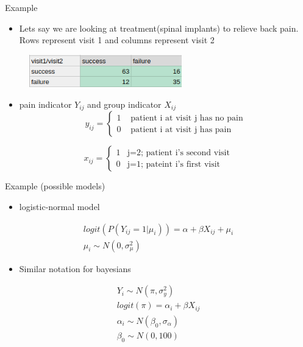 \documentclass[ignorenonframetext,]{beamer}
\providecommand{\tightlist}{%
  \setlength{\itemsep}{0pt}\setlength{\parskip}{0pt}}
\begin{document}
\begin{frame}{Example}

\begin{itemize}
\tightlist
\item
  Lets say we are looking at treatment(spinal implants) to relieve back
  pain. Rows represent visit 1 and columns represent visit 2
\end{itemize}

\begin{figure}
\centering
\includegraphics[width=2.60417in]{img6.png}
\caption{}
\end{figure}

\begin{itemize}
\tightlist
\item
  pain indicator \(Y_{ij}\) and group indicator \(X_{ij}\)
  \[y_{ij} = \begin{cases}
  1 & \text{ patient i at visit j has no pain} \\
  0 & \text{ patient i at visit j has pain}
   \end{cases}\]
\end{itemize}

\[x_{ij} = \begin{cases}
    1 & \text{j=2; patient i's second visit} \\
    0 & \text{j=1; pateint i's first visit}
 \end{cases}\]

\end{frame}

\begin{frame}{Example (possible models)}

\begin{itemize}
\tightlist
\item
  logistic-normal model
\end{itemize}

\[
\begin{aligned}
logit(P(Y_{ij}=1|\mu_i)) = \alpha + \beta X_{ij} + \mu_i \\
\mu_i \sim N(0, \sigma^2_{\mu})
\end{aligned}
\]

\begin{itemize}
\tightlist
\item
  Similar notation for bayesians
\end{itemize}

\[
\begin{aligned}
Y_i \sim N(\pi, \sigma^2_y) \\
logit(\pi) = \alpha_i + \beta X_{ij}\\
\alpha_i \sim N(\beta_0, \sigma_\alpha) \\
\beta_0 \sim N(0,100)
\end{aligned}
\]

\end{frame}
\end{document}
